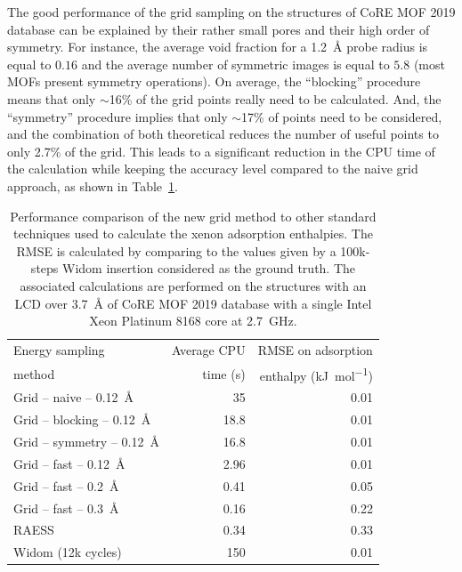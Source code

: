 \documentclass[main]{subfiles}
\begin{document}
The good performance of the grid sampling on the structures of CoRE MOF 2019 database can be explained by their rather small pores and their high order of symmetry. For instance, the average void fraction for a \SI{1.2}{\angstrom} probe radius is equal to $0.16$ and the average number of symmetric images is equal to $5.8$ (most MOFs present symmetry operations). On average, the ``blocking'' procedure means that only {$\sim$16\%} of the grid points really need to be calculated. And, the ``symmetry'' procedure implies that only {$\sim$17\%} of points need to be considered, and the combination of both theoretical reduces the number of useful points to only {2.7\%} of the grid. This leads to a significant reduction in the CPU time of the calculation while keeping the accuracy level compared to the naive grid approach, as shown in Table~\ref{tab:grid}. 

\setlength{\extrarowheight}{0.1cm}
\begin{table}[ht]
  \centering
  \begin{tabular}{|l|r|r|}
    \hline
    Energy sampling  &  Average CPU & RMSE on adsorption  \\
    method &  time (s)  &  enthalpy (\si{\kilo\joule\per\mole}) \\[0.5mm]
    \hline
    Grid -- naive -- \SI{0.12}{\angstrom} &  35 & 0.01  \\[0.5mm] 
    Grid -- blocking -- \SI{0.12}{\angstrom} &  18.8 & 0.01  \\ %
    Grid -- symmetry -- \SI{0.12}{\angstrom} &  16.8 & 0.01  \\ %
    Grid -- fast -- \SI{0.12}{\angstrom} &  2.96 & 0.01  \\
    Grid -- fast -- \SI{0.2}{\angstrom} &  0.41 & 0.05  \\
    Grid -- fast -- \SI{0.3}{\angstrom} &  0.16 & 0.22  \\
    RAESS\cite{Ren_2023}  &  0.34 & 0.33  \\
    Widom\cite{Widom1963} (12k cycles) &  150 & 0.01  \\
    \hline
  \end{tabular}
  \caption{Performance comparison of the new grid method to other standard techniques used to calculate the xenon adsorption enthalpies. The RMSE is calculated by comparing to the values given by a 100k-steps Widom insertion considered as the ground truth. The associated calculations are performed on the structures with an LCD over \SI{3.7}{\angstrom} of CoRE MOF 2019 database with a single Intel Xeon Platinum 8168 core at 2.7~GHz. }\label{tab:grid}
\end{table}
\end{document}
